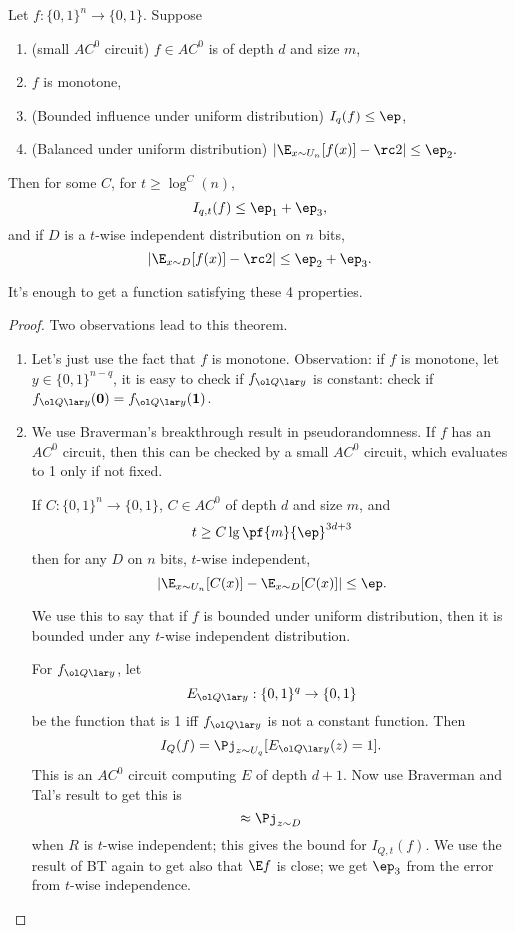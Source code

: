 
\begin{thm}
Let $f:\{0,1\}^n\to \{0,1\}$. Suppose
\begin{enumerate}
\item
(small $AC^0$ circuit) $f\in AC^0$ is of depth $d$ and size $m$,
\item
$f$ is monotone,
\item
(Bounded influence under uniform distribution) $I_q(f)\le \ep$,
\item
(Balanced under uniform distribution) $|\E_{x\sim U_n}[f(x)]-\rc 2|\le \ep_2.$
\end{enumerate}
Then for some $C$, for $t\ge \log^C(n)$, 
\[
I_{q,t}(f)\le \ep_1+\ep_3,
\]
and if $D$ is a $t$-wise independent distribution on $n$ bits,
\[
|\E_{x\sim D}[f(x)]-\rc 2|\le \ep_2+\ep_3.
\]
\end{thm}
It's enough to get a function satisfying these 4 properties.
\begin{proof}
Two observations lead to this theorem.
\begin{enumerate}
\item
Let's just use the fact that $f$ is monotone. Observation: if $f$ is monotone, let $y\in \{0,1\}^{n-q}$, it is easy to check if $f_{\ol Q\lar y}$ is constant: check if $f_{\ol Q\lar y}(\mathbf 0)=f_{\ol Q\lar y}(\mathbf 1)$.
\item
We use Braverman's breakthrough result in pseudorandomness. If $f$ has an $AC^0$ circuit, then this can be checked by a small $AC^0$ circuit, which evaluates to 1 only if not fixed.
\begin{thm}
If $C:\{0,1\}^n \to \{0,1\}$, $C\in AC^0$ of depth $d$ and size $m$, and
\[
t\ge C\lg\pf{m}{\ep}^{3d+3}
\]
then for any $D$ on $n$ bits, $t$-wise independent,
\[
|\E_{x\sim U_n}[C(x)] - \E_{x\sim D} [C(x)]|\le \ep.
\]
\end{thm}
We use this to say that if $f$ is bounded under uniform distribution, then it is bounded under any $t$-wise independent distribution.

For $f_{\ol Q\lar y}$, let 
\[
E_{\ol Q\lar y}: \{0,1\}^q \to \{0,1\}
\]
be the function that is 1 iff $f_{\ol Q\lar y}$ is not a constant function. Then
\[
I_Q(f)=\Pj_{z\sim U_q}[E_{\ol Q\lar y}(z)=1].
\]
This is an $AC^0$ circuit computing $E$ of depth $d+1$.
Now use Braverman and Tal's result to get this is
\[
\approx \Pj_{z\sim D}
\]
when $R$ is $t$-wise independent; this gives the bound for $I_{Q,t}(f)$. We use the result of BT again to get also that $\E f$ is close; we get $\ep_3$ from the error from $t$-wise independence.
\end{enumerate}
\end{proof}
